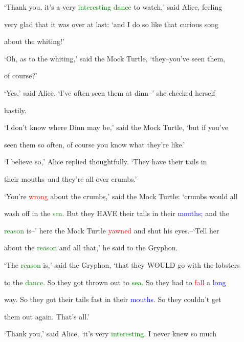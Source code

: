  ‘Thank you, it’s a very \textcolor{green}{interesting} \textcolor{green}{dance} to \textcolor{BurntOrange}{watch,’} said Alice, feeling

 very \textcolor{BurntOrange}{glad} that it was over at last: ‘and I do so like that curious song

 about the \textcolor{BurntOrange}{whiting!’}



 ‘Oh, as to the \textcolor{BurntOrange}{whiting,’} said the Mock Turtle, ‘they--you’ve seen them,

 of course?’



 ‘Yes,’ said Alice, ‘I’ve often seen them at dinn--’ she checked herself

 hastily.



 ‘I don’t know where Dinn may be,’ said the Mock Turtle, ‘but if you’ve

 seen them so often, of course you know what they’re like.’



 ‘I believe so,’ Alice replied thoughtfully. ‘They have their tails in

 their mouths--and they’re all over crumbs.’



 ‘You’re \textcolor{red}{wrong} about the crumbs,’ said the Mock Turtle: ‘crumbs would all

 wash off in the \textcolor{green}{sea.} But they HAVE their tails in their \textcolor{blue}{mouths;} and the

 \textcolor{green}{reason} is--’ here the Mock Turtle \textcolor{red}{yawned} and shut his eyes.--‘Tell her

 about the \textcolor{green}{reason} and all that,’ he said to the Gryphon.



 ‘The \textcolor{green}{reason} is,’ said the Gryphon, ‘that they WOULD go with the lobsters

 to the \textcolor{green}{dance.} So they got thrown out to \textcolor{green}{sea.} So they had to \textcolor{red}{fall} a \textcolor{blue}{long}

 way. So they got their tails fast in their \textcolor{blue}{mouths.} So they couldn’t get

 them out again. That’s all.’



 ‘Thank you,’ said Alice, ‘it’s very \textcolor{green}{interesting.} I never knew so much

